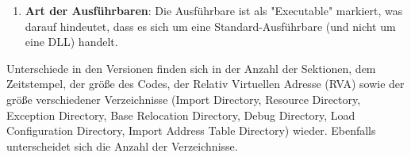 \documentclass{article}
\begin{document}
\begin{enumerate}
\begin{enumerate}
\begin{enumerate}
				\item \textbf{Art der Ausführbaren}: Die Ausführbare ist als "Executable" markiert, was darauf hindeutet, dass es sich um eine Standard-Ausführbare (und nicht um eine DLL) handelt.
			\end{enumerate}
		\end{enumerate}
		Unterschiede in den Versionen finden sich in der Anzahl der Sektionen, dem Zeitstempel, der größe des Codes, der Relativ Virtuellen Adresse (RVA) sowie der größe verschiedener Verzeichnisse (Import Directory, Resource Directory, Exception Directory, Base Relocation Directory, Debug Directory, Load Configuration Directory, Import Address Table Directory)  wieder. Ebenfalls unterscheidet sich die Anzahl der Verzeichnisse.\\
	\end{enumerate}
	
	\pagebreak
	
\end{document}
